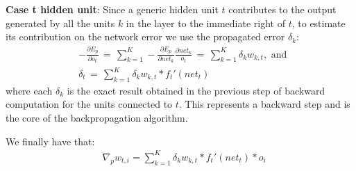 \textbf{Case t hidden unit}:
Since a generic hidden unit $t$ contributes to the output generated by all the units $k$ in the layer to the immediate right of $t$, to estimate its contribution on the network error we use the propagated error $\delta_k$:
\begin{align*}
    & -\frac{\partial E_p}{\partial o_{t}} \, = \, \sum_{k=1}^K -\frac{\partial E_p}{\partial net_k} \frac{\partial net_k}{o_t}\, =\, \sum_{k=1}^K \delta_kw_{k,t}, \text{ and }\\
    & \delta_t\, =\, \sum_{k=1}^K \delta_k w_{k,t} * {f_t}'(net_t)
\end{align*}
where each $\delta_k$ is the exact result obtained in the previous step of backward computation for the units connected to $t$. This represents a backward step and is the core of the backpropagation algorithm.

We finally have that:
\begin{align*}
    & \nabla_p w_{t,i} = \sum_{k=1}^K \delta_k w_{k,t} * {f_t}'(net_t) * o_i
\end{align*}
